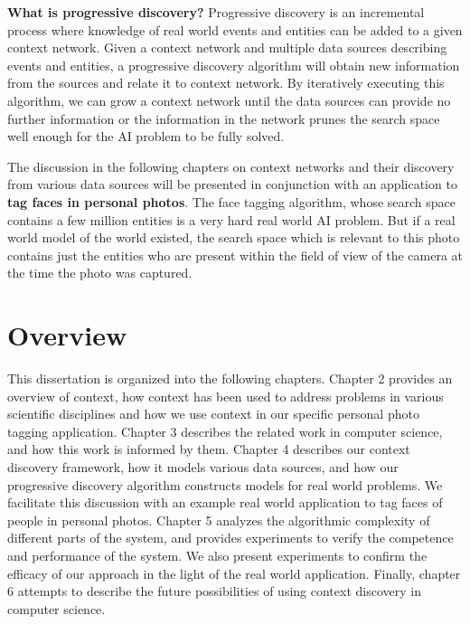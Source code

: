 \textbf{What is progressive discovery?} Progressive discovery is an incremental process where knowledge of real world events and entities can be added to a given context network. Given a context network and multiple data sources describing events and entities, a progressive discovery algorithm will obtain new information from the sources and relate it to context network. By iteratively executing this algorithm, we can grow a context network until the data sources can provide no further information or the information in the network prunes the search space well enough for the AI problem to be fully solved.

The discussion in the following chapters on context networks and their discovery from various data sources will be presented in conjunction with an application to \textbf{tag faces in personal photos}. The face tagging algorithm, whose search space contains a few million entities is a very hard real world AI problem. But if a real world model of the world existed, the search space which is relevant to this photo contains just the entities who are present within the field of view of the camera at the time the photo was captured. 

\section{Overview}
This dissertation is organized into the following chapters. Chapter 2 provides an overview of context, how context has been used to address problems in various scientific disciplines and how we use context in our specific personal photo tagging application. Chapter 3 describes the related work in computer science, and how this work is informed by them. Chapter 4 describes our context discovery framework, how it models various data sources, and how our progressive discovery algorithm constructs models for real world problems. We facilitate this discussion with an example real world application to tag faces of people in personal photos. Chapter 5 analyzes the algorithmic complexity of different parts of the system, and provides experiments to verify the competence and performance of the system. We also present experiments to confirm the efficacy of our approach in the light of the real world application. Finally, chapter 6 attempts to describe the future possibilities of using context discovery in computer science.


